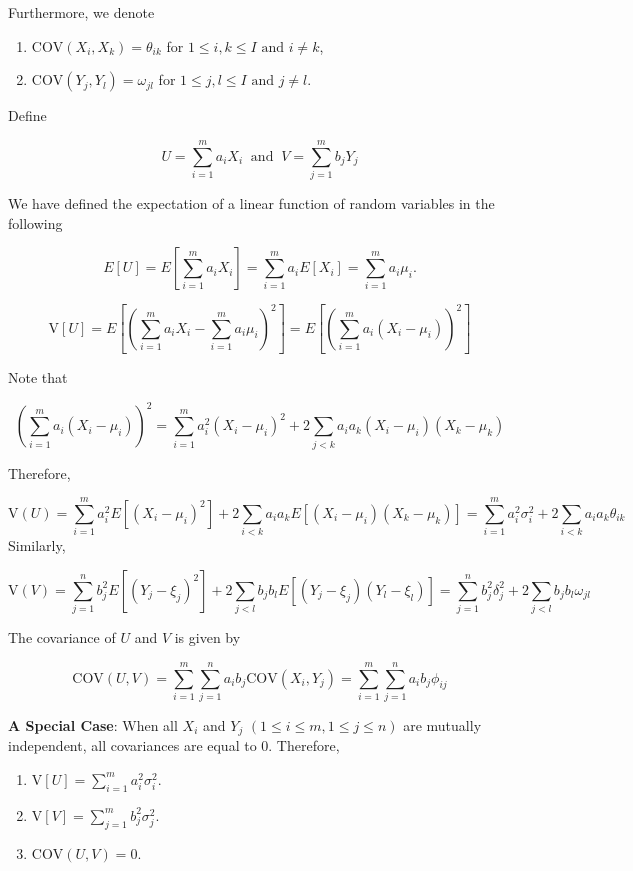 \documentclass[
]{book}
\begin{document}
Furthermore, we denote

\begin{enumerate}
\def\labelenumi{\arabic{enumi}.}
\setcounter{enumi}{5}
\item
  \(\text{COV}(X_i, X_k) = \theta_{ik}\) for \(1 \le i, k \le I \text{ and } i \ne k\),
\item
  \(\text{COV}(Y_j, Y_l) = \omega_{jl}\) for \(1 \le j, l \le I \text{ and } j \ne l\).
\end{enumerate}

Define

\[
U = \sum_{i=1}^m a_iX_i \ \text{ and } \ V = \sum_{j=1}^m b_jY_j
\]

We have defined the expectation of a linear function of random variables in the following

\[
E[U] = E[\sum_{i=1}^m a_iX_i] = \sum_{i=1}^ma_iE[X_i] = \sum_{i=1}^m a_i\mu_i.
\]

\[
\text{V}[U] = E\left[\left(\sum_{i=1}^m a_iX_i - \sum_{i=1}^m a_i\mu_i \right)^2\right] =  E\left[\left(\sum_{i=1}^m a_i(X_i - \mu_i) \right)^2\right]
\]

Note that

\[
\left(\sum_{i=1}^m a_i(X_i - \mu_i) \right)^2 = \sum_{i=1}^ma_i^2(X_i-\mu_i)^2 + 2\sum_{j<k}a_ia_k(X_i-\mu_i)(X_k-\mu_k)
\]

Therefore,

\[
\text{V}(U) = \sum_{i=1}^ma_i^2E\left[(X_i-\mu_i)^2\right] + 2\sum_{i<k}a_ia_kE\left[(X_i-\mu_i)(X_k-\mu_k)\right] = \sum_{i=1}^ma_i^2\sigma_i^2+2\sum_{i<k}a_ia_k \theta_{ik}
\]
Similarly,

\[
\text{V}(V) = \sum_{j=1}^nb_j^2E\left[(Y_j-\xi_j)^2\right] + 2\sum_{j<l}b_jb_lE\left[(Y_j-\xi_j)(Y_l-\xi_l)\right] = \sum_{j=1}^nb_j^2\delta_j^2+2\sum_{j<l}b_jb_l \omega_{jl}
\]

The covariance of \(U\) and \(V\) is given by

\[
\text{COV}(U,V) = \sum_{i=1}^m\sum_{j=1}^na_ib_j\text{COV}(X_i,Y_j) =\sum_{i=1}^m\sum_{j=1}^na_ib_j \phi_{ij} 
\]

\hfill\break

\textbf{A Special Case}: When all \(X_i\) and \(Y_j\) \((1 \le i \le m, 1 \le j \le n)\) are mutually independent, all covariances are equal to 0. Therefore,

\begin{enumerate}
\def\labelenumi{\arabic{enumi}.}
\item
  \(\text{V}[U] = \sum_{i=1}^ma_i^2\sigma_i^2\).
\item
  \(\text{V}[V] = \sum_{j=1}^mb_j^2\sigma_j^2\).
\item
  \(\text{COV}(U,V)=0\).
\end{enumerate}
\end{document}
